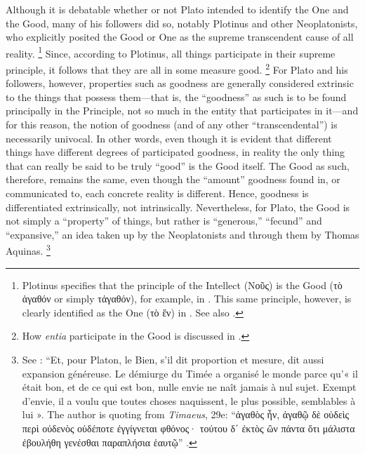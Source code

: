 %
Although it is debatable whether or not Plato intended to identify the One and the Good, many of his followers did so, notably Plotinus and other Neoplatonists, who explicitly posited the Good or One as the supreme transcendent cause of all reality.%
%
\footnote{Plotinus specifies that the principle of the Intellect (Νοῦς) is the Good (τὸ ἀγαθόν or simply τἀγαθόν), for example, in \cite[V,~1,~8.]{plotinus:enneads}. This same principle, however, is clearly identified as the One (τὸ ἕν) in \cite[V,~1,~1]{plotinus:enneads}. See also \cite[VI,~7–9]{plotinus:enneads}.}
%
Since, according to Plotinus, all things participate in their supreme principle, it follows that they are all in some measure good.%
%
\footnote{How \emph{entia} participate in the Good is discussed in \cite[I, 7]{plotinus:enneads}.}
%
For Plato and his followers, however, properties such as goodness are generally considered extrinsic to the things that possess them—that is, the \enquote{goodness} as such is to be found principally in the Principle, not so much in the entity that participates in it—and for this reason, the notion of goodness (and of any other \enquote{transcendental}) is necessarily univocal. In other words, even though it is evident that different things have different degrees of participated goodness, in reality the only thing that can really be said to be truly \enquote{good} is the Good itself. The Good as such, therefore, remains the same, even though the “amount” goodness found in, or communicated to, each concrete reality is different. Hence, goodness is differentiated extrinsically, not intrinsically. Nevertheless, for Plato, the Good is not simply a “property” of things, but rather is “generous,” “fecund” and “expansive,” an idea taken up by the Neoplatonists and through them by Thomas Aquinas.%
%
\footnote{See \cite[62]{definance:etre-et-agir}: “Et, pour Platon, le Bien, s’il dit proportion et mesure, dit aussi expansion généreuse. Le démiurge du Timée a organisé le monde parce qu’« il était bon, et de ce qui est bon, nulle envie ne naît jamais à nul sujet. Exempt d’envie, il a voulu que toutes choses naquissent, le plus possible, semblables à lui ». The author is quoting from \emph{Timaeus}, 29e: “ἀγαθὸς ἦν, ἀγαθῷ δὲ οὐδεὶς περὶ οὐδενὸς οὐδέποτε ἐγγίγνεται φθόνος· τούτου δ΄ ἐκτὸς ὢν πάντα ὅτι μάλιστα ἐβουλήθη γενέσθαι παραπλήσια ἑαυτῷ” \parencite{plato:timaeus}.}
%


